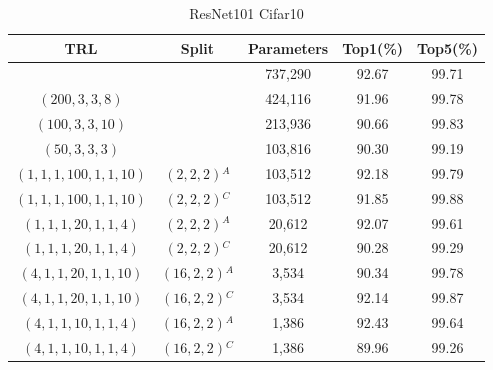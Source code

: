 \documentclass{article}
\begin{document}
	
	\begin{table}
		\centering
		\begin{tabular}{c c c c c}
			\hline
			\textbf{TRL} & \textbf{Split} & \textbf{Parameters} & \textbf{Top1(\%)} & \textbf{Top5(\%)} \\
			\hline
			& & 737,290 & 92.67 & 99.71 \\
			$(200,3,3,8)$ & & 424,116 & 91.96 & 99.78 \\
			$(100,3,3,10)$ & & 213,936 & 90.66 & 99.83 \\
			$(50,3,3,3)$ & & 103,816 & 90.30 & 99.19 \\
			$(1,1,1,100,1,1,10)$ & $(2,2,2)$$^A$ & 103,512 & 92.18 & 99.79 \\
			$(1,1,1,100,1,1,10)$ & $(2,2,2)$$^C$ & 103,512 & 91.85 & 99.88 \\
			$(1,1,1,20,1,1,4)$ & $(2,2,2)$$^A$ & 20,612 & 92.07 & 99.61 \\
			$(1,1,1,20,1,1,4)$ & $(2,2,2)$$^C$ & 20,612 & 90.28 & 99.29 \\
			$(4,1,1,20,1,1,10)$ & $(16,2,2)$$^A$ & 3,534 & 90.34 & 99.78 \\
			$(4,1,1,20,1,1,10)$ & $(16,2,2)$$^C$ & 3,534 & 92.14 & 99.87 \\
			$(4,1,1,10,1,1,4)$ & $(16,2,2)$$^A$ & 1,386 & 92.43 & 99.64 \\
			$(4,1,1,10,1,1,4)$ & $(16,2,2)$$^C$ & 1,386 & 89.96 & 99.26 \\
			\hline
		\end{tabular}
		\caption{ResNet101 Cifar10}
		\label{tab:ResNet101 cifar10}
	\end{table}
	
	
	
\end{document}
